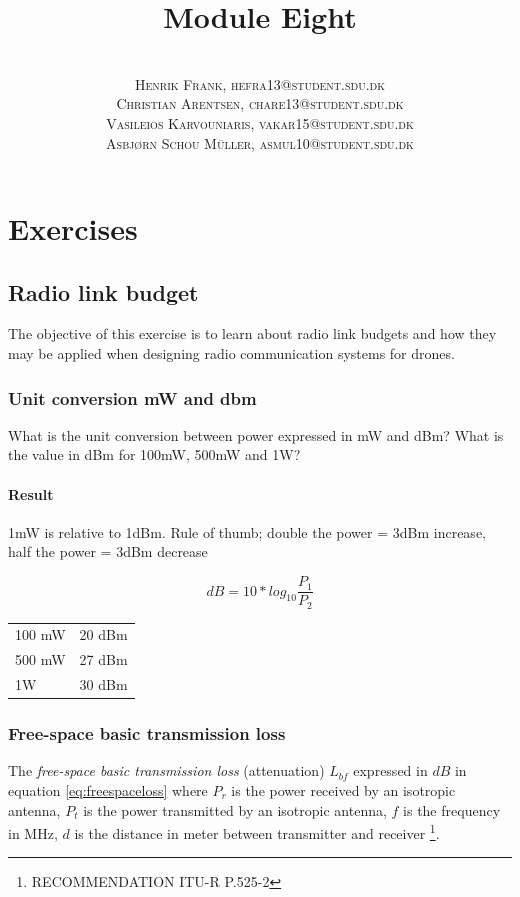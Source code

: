 \documentclass[paper=letter, fontsize=10pt]{article}
\title{\vspace{-15mm}\fontsize{24pt}{10pt}\selectfont\textbf{Module Eight }} %
\author{
\large
{\textsc{}}\\[2mm]
{\textsc{Henrik Frank, hefra13@student.sdu.dk }}\\[2mm]
{\textsc{Christian Arentsen, chare13@student.sdu.dk }}\\[2mm]
{\textsc{Vasileios Karvouniaris, vakar15@student.sdu.dk }}\\[2mm]
{\textsc{Asbjørn Schou Müller, asmul10@student.sdu.dk }}
}
\date{}
\begin{document}
\maketitle %
\thispagestyle{fancy} %

\section{Exercises}

\subsection{Radio link budget}
The objective of this exercise is to learn about radio link budgets and how they may be applied when designing radio communication systems for drones.

\subsubsection{Unit conversion mW and dbm}

What is the unit conversion between power expressed in mW and dBm? What is the value in dBm for 100mW, 500mW and 1W?

\paragraph{Result} 1mW is relative to 1dBm. Rule of thumb; double the power = 3dBm increase, half the power = 3dBm decrease

\begin{equation*}
dB = 10*log_10 \frac{P_1}{P_2}
\end{equation*}

\begin{tabular}{| l | l | }
  100 mW & 20 dBm \\
  500 mW & 27 dBm \\
  1W & 30 dBm
\end{tabular}

\subsubsection{Free-space basic transmission loss}
\label{sec:freesp}
The \textit{free-space basic transmission loss} (attenuation) $L_{bf}$ expressed in $dB$ in equation \ref{eq:freespaceloss} where $P_r$ is the power received by an isotropic antenna, $P_t$ is the power transmitted by an isotropic antenna, $f$ is the frequency in MHz, $d$ is the distance in meter between transmitter and receiver \footnote{RECOMMENDATION ITU-R P.525-2}. 
\end{document}
